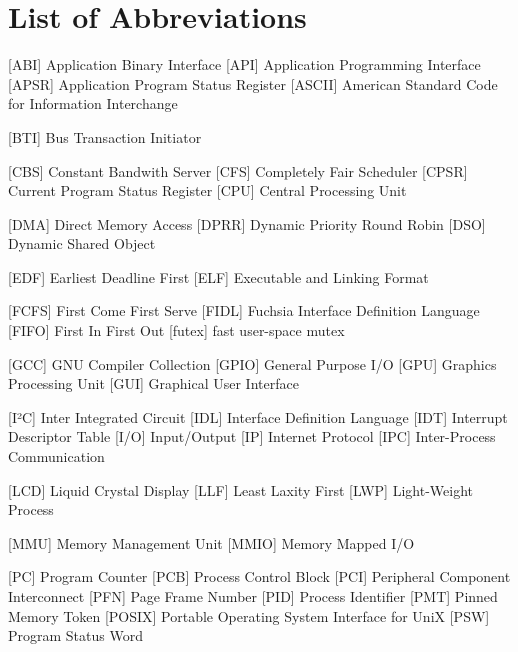 
\chapter*{List of Abbreviations}

\begin{acronym} [POSIX]
 [ABI] {Application Binary Interface}
 [API] {Application Programming Interface}
 [APSR] {Application Program Status Register}
 [ASCII] {American Standard Code for Information Interchange}

 [BTI] {Bus Transaction Initiator}

 [CBS] {Constant Bandwith Server}
 [CFS] {Completely Fair Scheduler}
 [CPSR] {Current Program Status Register}
 [CPU] {Central Processing Unit}

 [DMA] {Direct Memory Access}
 [DPRR] {Dynamic Priority Round Robin}
 [DSO] {Dynamic Shared Object}

 [EDF] {Earliest Deadline First}
 [ELF] {Executable and Linking Format}

 [FCFS] {First Come First Serve}
 [FIDL] {Fuchsia Interface Definition Language}
 [FIFO] {First In First Out}
 [futex] {fast user-space mutex}

 [GCC] {GNU Compiler Collection}
[GPIO] {General Purpose I/O}
 [GPU] {Graphics Processing Unit}
 [GUI] {Graphical User Interface}


 [I²C] {Inter Integrated Circuit}
 [IDL] {Interface Definition Language}
 [IDT] {Interrupt Descriptor Table}
 [I/O] {Input/Output}
 [IP] {Internet Protocol}
[IPC] {Inter-Process Communication}



 [LCD] {Liquid Crystal Display}
 [LLF] {Least Laxity First}
 [LWP] {Light-Weight Process}

 [MMU] {Memory Management Unit}
[MMIO] {Memory Mapped I/O}



 [PC] {Program Counter}
 [PCB] {Process Control Block}
 [PCI] {Peripheral Component Interconnect}
 [PFN] {Page Frame Number}
 [PID] {Process Identifier}
 [PMT] {Pinned Memory Token}
 [POSIX] {Portable Operating System Interface for UniX}
 [PSW] {Program Status Word}


\end{acronym}
